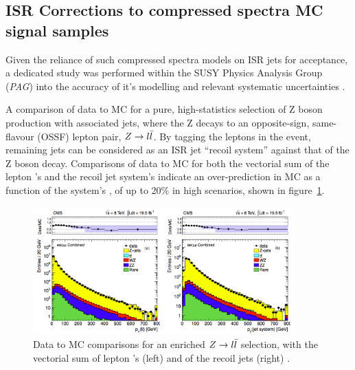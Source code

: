 

\subsection{ISR Corrections to compressed spectra MC signal samples}
\label{sec:isr_reweighting}

Given the reliance of such compressed spectra models on ISR jets for acceptance,
a dedicated study was performed within the SUSY Physics Analysis Group (\emph{PAG})
into the accuracy of it's modelling and relevant systematic uncertainties \cite{susy-isrrw}.

A comparison of data to MC for a pure, high-statistics selection
of Z boson production with associated jets, where the Z decays to an opposite-sign,
same-flavour (OSSF) lepton pair, $Z\rightarrow l\bar{l}$. By tagging the leptons in 
the event, remaining jets can be considered as an ISR jet ``recoil system'' 
against that of the Z boson decay. Comparisons of data to MC for both the 
vectorial sum of the lepton \Ptvect's and the recoil jet system's \Ptvect indicate an
over-prediction in MC as a function of the system's \Pt, of up to 20\% in 
high \Pt scenarios, shown in figure~\ref{fig:isr_datamc}.

\begin{figure}[t!]
    \centering
    \includegraphics[width=0.9\textwidth]{Figs/isr/isr_zjets_distros.pdf}
    \caption{Data to MC comparisons for an enriched $Z \rightarrow l\bar{l}$ selection, 
    with the vectorial sum of lepton \Pt's (left) and of the recoil jets (right)
    \cite{susy-isrrw}.}
    \label{fig:isr_datamc}
\end{figure}

